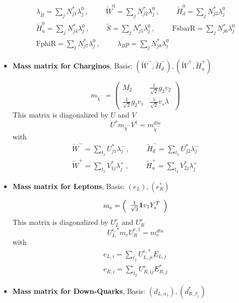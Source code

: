 \begin{itemize}
\begin{align}
\lambda_{\tilde{B}} = \sum_{j}N^*_{j 1}\lambda^0_{{j}}\,, \hspace{1cm} 
\tilde{W}^0 = \sum_{j}N^*_{j 2}\lambda^0_{{j}}\,, \hspace{1cm} 
\tilde{H}_d^0 = \sum_{j}N^*_{j 3}\lambda^0_{{j}}\\ 
\tilde{H}_u^0 = \sum_{j}N^*_{j 4}\lambda^0_{{j}}\,, \hspace{1cm} 
\tilde{S} = \sum_{j}N^*_{j 5}\lambda^0_{{j}}\,, \hspace{1cm} 
\text{FsbarR} = \sum_{j}N^*_{j 6}\lambda^0_{{j}}\\ 
\text{FphiR} = \sum_{j}N^*_{j 7}\lambda^0_{{j}}\,, \hspace{1cm} 
\lambda_Bp = \sum_{j}N^*_{j 8}\lambda^0_{{j}}
\end{align} 
\item {\bf Mass matrix for Charginos}, Basis: \( \left(\tilde{W}^-, \tilde{H}_d^-\right), \left(\tilde{W}^+, \tilde{H}_u^+\right) \) 
 
\begin{equation} 
m_{\tilde{\chi}^-} = \left( 
\begin{array}{cc}
M_2 &\frac{1}{\sqrt{2}} g_2 v_2 \\ 
\frac{1}{\sqrt{2}} g_2 v_1  &\frac{1}{\sqrt{2}} v_s \lambda \end{array} 
\right) 
 \end{equation} 
This matrix is diagonalized by \(U\) and \(V\) 
\begin{equation} 
U^* m_{\tilde{\chi}^-} V^{\dagger} = m^{dia}_{\tilde{\chi}^-} 
\end{equation} 
with 
\begin{align} 
\tilde{W}^- = \sum_{t_2}U^*_{j 1}\lambda^-_{{j}}\,, \hspace{1cm} 
\tilde{H}_d^- = \sum_{t_2}U^*_{j 2}\lambda^-_{{j}}\\ 
\tilde{W}^+ = \sum_{t_2}V^*_{1 j}\lambda^+_{{j}}\,, \hspace{1cm} 
\tilde{H}_u^+ = \sum_{t_2}V^*_{2 j}\lambda^+_{{j}}
\end{align} 
\item {\bf Mass matrix for Leptons}, Basis: \( \left(e_L\right), \left(e_R^*\right) \) 
 
\begin{equation} 
m_{e} = \left( 
\begin{array}{c}
\frac{1}{\sqrt{2}} {\bf 1} v_1 Y_{e}^{T} \end{array} 
\right) 
 \end{equation} 
This matrix is diagonalized by \(U^e_L\) and \(U^e_R\) 
\begin{equation} 
U^{e,*}_L m_{e} U_{R}^{e,\dagger} = m^{dia}_{e} 
\end{equation} 
with 
\begin{align} 
e_{L,{i}} = \sum_{t_2}U^{e,*}_{L,{j i}}E_{L,{j}}\\ 
e_{R,{i}} = \sum_{t_2}U_{R,{i j}}^{e}E^*_{R,{j}}
\end{align} 
\item {\bf Mass matrix for Down-Quarks}, Basis: \( \left(d_{L,{{\alpha_1}}}\right), \left(d^*_{R,{{\beta_1}}}\right) \) 
 

\end{itemize}
